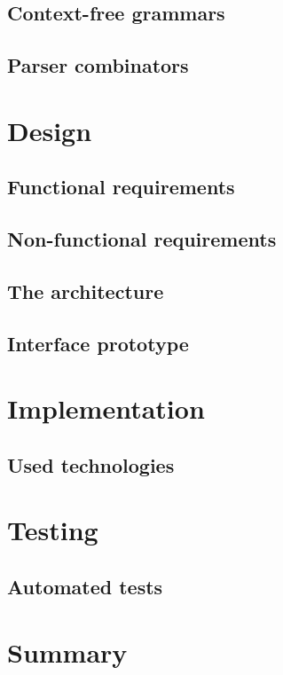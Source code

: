 \documentclass[english,engineering]{wizthesis}
\begin{document}
\section{Context-free grammars}

\section{Parser combinators}

\chapter{Design}

\section{Functional requirements}

\section{Non-functional requirements}

\section{The architecture}

\section{Interface prototype}

\chapter{Implementation}

\section{Used technologies}

\chapter{Testing}

\section{Automated tests}

{\backmatter %
\chapter{Summary}}
\end{document}

